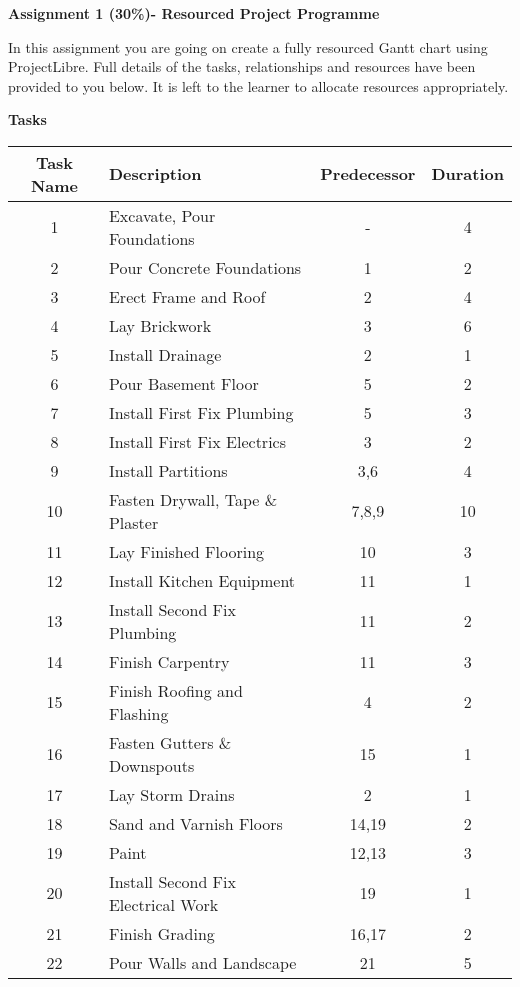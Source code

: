 
	
\begin{flushleft}
\Large\textbf{Assignment 1 (30\%)- Resourced Project Programme}\\
\end{flushleft}

In this assignment you are going on create a fully resourced Gantt chart using ProjectLibre.  Full details of the tasks, relationships and resources have been provided to you below.  It is left to the learner to allocate resources appropriately. 


\vspace{.5cm}
\large\textbf{Tasks}\\
\vspace{.25cm}

\begin{tabular}{|c|l|c|c|}
	\hline 
	\textbf{Task Name} & \textbf{Description} & \textbf{Predecessor} & \textbf{Duration} \\ 
	\hline 
	
	1	& Excavate, Pour Foundations &	-	&4\\\hline 
	2	& Pour Concrete Foundations		&1	&2\\\hline 
	3	& Erect Frame and Roof			&2	&4\\\hline 
	4	& Lay Brickwork					&3	&6\\\hline 
	5	& Install Drainage				&2	&1\\\hline 
	6	& Pour Basement Floor			&5	&2\\\hline 
	7	& Install First Fix Plumbing		&5	&3\\\hline 
	8	& Install First Fix Electrics	&3	&2\\\hline 
	9	& Install Partitions				&3,6	&4\\\hline
	10	& Fasten Drywall, Tape \& Plaster	&7,8,9	&10\\\hline 
	11	& Lay Finished Flooring			&10	&3\\\hline 
	12	& Install Kitchen Equipment		&11	&1\\\hline 
	13	& Install Second Fix Plumbing	&11	&2\\\hline 
	14	& Finish Carpentry				&11	&3\\\hline
	15	& Finish Roofing and Flashing	&4	&2\\\hline 
	16	& Fasten Gutters \& Downspouts	&15	&1\\\hline 
	17	& Lay Storm Drains				&2	&1\\\hline 
	18	& Sand and Varnish Floors		&14,19	&2\\\hline 
	19	& Paint							&12,13	&3\\\hline 
	20	& Install Second Fix Electrical Work	&19	&1\\\hline 
	21	& Finish Grading					&16,17	&2 \\\hline
	22	& Pour Walls and Landscape		&21	&5 \\
	\hline 
	 
\end{tabular} 


